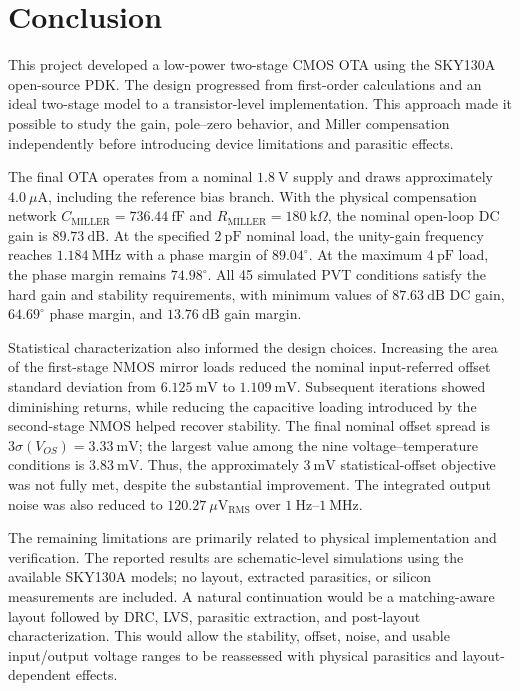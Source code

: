 
\section{Conclusion}

This project developed a low-power two-stage CMOS OTA using the SKY130A
open-source PDK. The design progressed from first-order calculations and
an ideal two-stage model to a transistor-level implementation. This
approach made it possible to study the gain, pole--zero behavior, and
Miller compensation independently before introducing device limitations
and parasitic effects.

The final OTA operates from a nominal $1.8~\mathrm{V}$ supply and draws
approximately $4.0~\mu\mathrm{A}$, including the reference bias branch.
With the physical compensation network
$C_{\mathrm{MILLER}}=736.44~\mathrm{fF}$ and
$R_{\mathrm{MILLER}}=180~\mathrm{k}\Omega$, the nominal open-loop DC gain is
$89.73~\mathrm{dB}$. At the specified $2~\mathrm{pF}$ nominal load, the
unity-gain frequency reaches $1.184~\mathrm{MHz}$ with a phase margin of
$89.04^\circ$. At the maximum $4~\mathrm{pF}$ load, the phase margin
remains $74.98^\circ$. All 45 simulated PVT conditions satisfy the hard
gain and stability requirements, with minimum values of $87.63~\mathrm{dB}$
DC gain, $64.69^\circ$ phase margin, and $13.76~\mathrm{dB}$ gain margin.

Statistical characterization also informed the design choices. Increasing
the area of the first-stage NMOS mirror loads reduced the nominal
input-referred offset standard deviation from $6.125~\mathrm{mV}$ to
$1.109~\mathrm{mV}$. Subsequent iterations showed diminishing returns,
while reducing the capacitive loading introduced by the second-stage NMOS
helped recover stability. The final nominal offset spread is
$3\sigma(V_{OS})=3.33~\mathrm{mV}$; the largest value among the nine
voltage--temperature conditions is $3.83~\mathrm{mV}$. Thus, the
approximately $3~\mathrm{mV}$ statistical-offset objective was not fully
met, despite the substantial improvement. The integrated output noise
was also reduced to $120.27~\mu\mathrm{V}_{\mathrm{RMS}}$ over
$1~\mathrm{Hz}$--$1~\mathrm{MHz}$.

The remaining limitations are primarily related to physical
implementation and verification. The reported results are schematic-level
simulations using the available SKY130A models; no layout, extracted
parasitics, or silicon measurements are included. A natural continuation
would be a matching-aware layout followed by DRC, LVS, parasitic
extraction, and post-layout characterization. This would allow the
stability, offset, noise, and usable input/output voltage ranges to be
reassessed with physical parasitics and layout-dependent effects.
